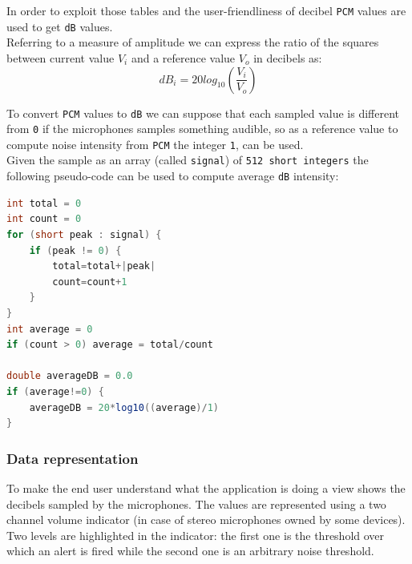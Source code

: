 \documentclass[conference]{IEEEtran}
\begin{document}
In order to exploit those tables and the user-friendliness of decibel \texttt{PCM} values are used to get \texttt{dB} values.\\ 
Referring to a measure of amplitude we can express the ratio of the squares between current value $V_i$ and a reference value $V_o$ in decibels as:\\

\begin{equation}
dB_i = 20log_{10} \left(\frac{V_i}{V_o}\right)
\end{equation}

To convert \texttt{PCM} values to \texttt{dB} we can suppose that each sampled value is different from \texttt{0} if the microphones samples something audible, so as a reference value to compute noise intensity from \texttt{PCM} the integer \texttt{1}, can be used.\\

Given the sample as an array (called \texttt{signal}) of \texttt{512 short integers} the following pseudo-code can be used to compute average \texttt{dB} intensity:

\begin{lstlisting}[language=Java, caption=Pseudocode for computing dB from PCM samples]
int total = 0
int count = 0
for (short peak : signal) {
	if (peak != 0) {
		total=total+|peak|
		count=count+1
	}
}
int average = 0
if (count > 0) average = total/count

double averageDB = 0.0
if (average!=0) {
	averageDB = 20*log10((average)/1)
}
\end{lstlisting}

\subsubsection{\textbf{Data representation}}

To make the end user understand what the application is doing a view shows the decibels sampled by the microphones. The values are represented using a two channel volume indicator (in case of stereo microphones owned by some devices). Two levels are highlighted in the indicator: the first one is the threshold over which an alert is fired while the second one is an arbitrary noise threshold.
\end{document}
